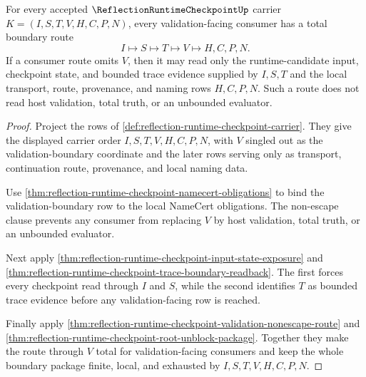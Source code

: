 \begin{theorem}
\label{thm:reflection-runtime-checkpoint-validation-boundary-totality}
For every accepted $\ReflectionRuntimeCheckpointUp$ carrier $K=(I,S,T,V,H,C,P,N)$, every validation-facing consumer has a total boundary route
$$
I \longmapsto S \longmapsto T \longmapsto V \longmapsto H,C,P,N.
$$
If a consumer route omits $V$, then it may read only the runtime-candidate input, checkpoint state, and bounded trace evidence supplied by $I,S,T$ and the local transport, route, provenance, and naming rows $H,C,P,N$. Such a route does not read host validation, total truth, or an unbounded evaluator.
\end{theorem}
\begin{proof}
Project the rows of \autoref{def:reflection-runtime-checkpoint-carrier}. They give the displayed carrier order $I,S,T,V,H,C,P,N$, with $V$ singled out as the validation-boundary coordinate and the later rows serving only as transport, continuation route, provenance, and local naming data.

Use \autoref{thm:reflection-runtime-checkpoint-namecert-obligations} to bind the validation-boundary row to the local NameCert obligations. The non-escape clause prevents any consumer from replacing $V$ by host validation, total truth, or an unbounded evaluator.

Next apply \autoref{thm:reflection-runtime-checkpoint-input-state-exposure} and \autoref{thm:reflection-runtime-checkpoint-trace-boundary-readback}. The first forces every checkpoint read through $I$ and $S$, while the second identifies $T$ as bounded trace evidence before any validation-facing row is reached.

Finally apply \autoref{thm:reflection-runtime-checkpoint-validation-nonescape-route} and \autoref{thm:reflection-runtime-checkpoint-root-unblock-package}. Together they make the route through $V$ total for validation-facing consumers and keep the whole boundary package finite, local, and exhausted by $I,S,T,V,H,C,P,N$.
\end{proof}

